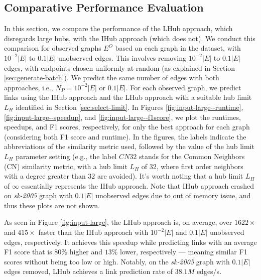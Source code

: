 \subsection{Comparative Performance Evaluation}

In this section, we compare the performance of the LHub approach, which disregards large hubs, with the IHub approach (which does not). We conduct this comparison for observed graphs $E^O$ based on each graph in the dataset, with $10^{-2}|E|$ to $0.1|E|$ unobserved edges. This involves removing $10^{-2}|E|$ to $0.1|E|$ edges, with endpoints chosen uniformly at random (as explained in Section \ref{sec:generate-batch}). We predict the same number of edges with both approaches, i.e., $N_P = 10^{-2}|E|$ or $0.1|E|$. For each observed graph, we predict links using the IHub approach and the LHub approach with a suitable hub limit $L_H$ identified in Section \ref{sec:select-limit}. In Figures \ref{fig:input-large--runtime}, \ref{fig:input-large--speedup}, and \ref{fig:input-large--f1score}, we plot the runtimes, speedups, and F1 scores, respectively, for only the best approach for each graph (considering both F1 score and runtime). In the figures, the labels indicate the abbreviations of the similarity metric used, followed by the value of the hub limit $L_H$ parameter setting (e.g., the label $CN32$ stands for the Common Neighbors (CN) similarity metric, with a hub limit $L_H$ of $32$, where first order neighbors with a degree greater than $32$ are avoided). It's worth noting that a hub limit $L_H$ of $\infty$ essentially represents the IHub approach. Note that IHub approach crashed on \textit{sk-2005} graph with $0.1|E|$ unobserved edges due to out of memory issue, and thus these plots are not shown.





As seen in Figure \ref{fig:input-large}, the LHub approach is, on average, over $1622\times$ and $415\times$ faster than the IHub approach with $10^{-2}|E|$ and $0.1|E|$ unobserved edges, respectively. It achieves this speedup while predicting links with an average F1 score that is $80\%$ higher and $13\%$ lower, respectively --- meaning similar F1 scores without being too low or high. Notably, on the \textit{sk-2005} graph with $0.1|E|$ edges removed, LHub achieves a link prediction rate of $38.1M$ edges/s.


